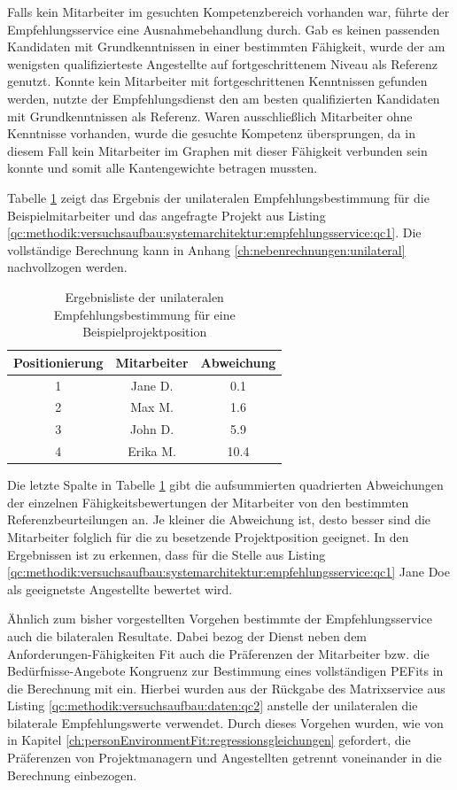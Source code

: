Falls kein Mitarbeiter im gesuchten Kompetenzbereich vorhanden war, führte der Empfehlungsservice eine Ausnahmebehandlung durch. Gab es keinen passenden Kandidaten mit Grundkenntnissen in einer bestimmten Fähigkeit, wurde der am wenigsten qualifizierteste Angestellte auf fortgeschrittenem Niveau als Referenz genutzt. Konnte kein Mitarbeiter mit fortgeschrittenen Kenntnissen gefunden werden, nutzte der Empfehlungsdienst den am besten qualifizierten Kandidaten mit Grundkenntnissen als Referenz. Waren ausschließlich Mitarbeiter ohne Kenntnisse vorhanden, wurde die gesuchte Kompetenz übersprungen, da in diesem Fall kein Mitarbeiter im Graphen mit dieser Fähigkeit verbunden sein konnte und somit alle Kantengewichte \nullWert betragen mussten.

Tabelle \ref{tbl:methodik:versuchsaufbau:unilateral:tbl2} zeigt das Ergebnis der unilateralen Empfehlungsbestimmung für die Beispielmitarbeiter und das angefragte Projekt aus Listing \ref{qc:methodik:versuchsaufbau:systemarchitektur:empfehlungsservice:qc1}. Die vollständige Berechnung kann in Anhang \ref{ch:nebenrechnungen:unilateral} nachvollzogen werden.

\begin{table}[h]
	\centering
	\begin{tabular}{c|c|c}
		\textbf{Positionierung} & \textbf{Mitarbeiter} & \textbf{Abweichung}\\
		\hline
		1 & Jane D.  & 0.1\\
		2 & Max M.   & 1.6\\
		3 & John D.  & 5.9\\
		4 & Erika M. & 10.4
	\end{tabular}
	\caption{Ergebnisliste der unilateralen Empfehlungsbestimmung für eine Beispielprojektposition}
	\label{tbl:methodik:versuchsaufbau:unilateral:tbl2}
\end{table}

Die letzte Spalte in Tabelle \ref{tbl:methodik:versuchsaufbau:unilateral:tbl2} gibt die aufsummierten quadrierten Abweichungen der einzelnen Fähigkeitsbewertungen der Mitarbeiter von den bestimmten Referenzbeurteilungen an. Je kleiner die Abweichung ist, desto besser sind die Mitarbeiter folglich für die zu besetzende Projektposition geeignet. In den Ergebnissen ist zu erkennen, dass für die Stelle aus Listing \ref{qc:methodik:versuchsaufbau:systemarchitektur:empfehlungsservice:qc1} Jane Doe als geeignetste Angestellte bewertet wird.

Ähnlich zum bisher vorgestellten Vorgehen bestimmte der Empfehlungsservice auch die bilateralen Resultate. Dabei bezog der Dienst neben dem Anforderungen-Fähigkeiten Fit auch die Präferenzen der Mitarbeiter bzw. die Bedürfnisse-Angebote Kongruenz zur Bestimmung eines vollständigen \acp{PEFit} in die Berechnung mit ein. Hierbei wurden aus der Rückgabe des Matrixservice aus Listing \ref{qc:methodik:versuchsaufbau:daten:qc2} anstelle der unilateralen die bilaterale Empfehlungswerte verwendet. Durch dieses Vorgehen wurden, wie von \textcite[S. 51ff.]{edwards:1991} in Kapitel \ref{ch:personEnvironmentFit:regressionsgleichungen} gefordert, die Präferenzen von Projektmanagern und Angestellten getrennt voneinander in die Berechnung einbezogen.

